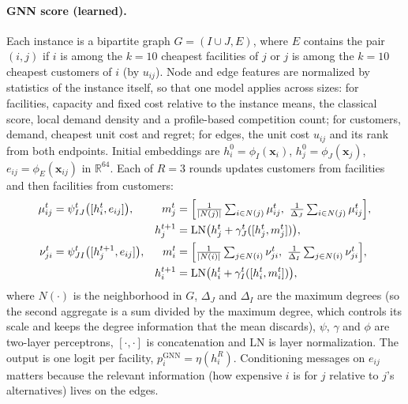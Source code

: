 \paragraph{GNN score (learned).} Each instance is a bipartite graph $G=(I\cup J,E)$, where $E$
contains the pair $(i,j)$ if $i$ is among the $k=10$ cheapest facilities of $j$ or $j$ is among
the $k=10$ cheapest customers of $i$ (by $u_{ij}$). Node and edge features are normalized by
statistics of the instance itself, so that one model applies across sizes: for facilities,
capacity and fixed cost relative to the instance means, the classical score, local demand
density and a profile-based competition count; for customers, demand, cheapest unit cost and
regret; for edges, the unit cost $u_{ij}$ and its rank from both endpoints.
Initial embeddings are $h^{0}_i=\phi_I(\mathbf{x}_i)$, $h^{0}_j=\phi_J(\mathbf{x}_j)$,
$e_{ij}=\phi_E(\mathbf{x}_{ij})$ in $\mathbb{R}^{64}$. Each of $R=3$ rounds updates customers
from facilities and then facilities from customers:
{\small
\begin{align}
\mu^{t}_{ij} &= \psi^{t}_{IJ}\bigl([h^{t}_i,e_{ij}]\bigr), &
m^{t}_{j} &= \Bigl[\tfrac{1}{|N(j)|}\textstyle\sum_{i\in N(j)}\mu^{t}_{ij},\
\tfrac{1}{\Delta_J}\sum_{i\in N(j)}\mu^{t}_{ij}\Bigr], \nonumber\\
&& h^{t+1}_j &= \mathrm{LN}\bigl(h^{t}_j+\gamma^{t}_{J}([h^{t}_j,m^{t}_j])\bigr), \label{eq:mpj}\\
\nu^{t}_{ji} &= \psi^{t}_{JI}\bigl([h^{t+1}_j,e_{ij}]\bigr), &
m^{t}_{i} &= \Bigl[\tfrac{1}{|N(i)|}\textstyle\sum_{j\in N(i)}\nu^{t}_{ji},\
\tfrac{1}{\Delta_I}\sum_{j\in N(i)}\nu^{t}_{ji}\Bigr], \nonumber\\
&& h^{t+1}_i &= \mathrm{LN}\bigl(h^{t}_i+\gamma^{t}_{I}([h^{t}_i,m^{t}_i])\bigr), \label{eq:mpi}
\end{align}}
where $N(\cdot)$ is the neighborhood in $G$, $\Delta_J$ and $\Delta_I$ are the maximum degrees
(so the second aggregate is a sum divided by the maximum degree, which controls its scale and
keeps the degree information that the mean discards), $\psi$, $\gamma$ and $\phi$ are two-layer perceptrons, $[\cdot,\cdot]$ is
concatenation and $\mathrm{LN}$ is layer normalization. The output is one logit per facility,
$p^{\mathrm{GNN}}_i=\eta(h^{R}_i)$. Conditioning messages on $e_{ij}$ matters because the
relevant information (how expensive $i$ is for $j$ relative to $j$'s alternatives) lives on the
edges.


